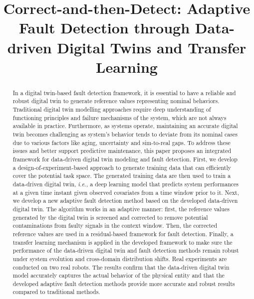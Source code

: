\documentclass[a4paper,10pt]{cas-sc}%
\newcommand{\rev}[1]{\textcolor{revisionred}{#1}}
\begin{document}
\let\WriteBookmarks\relax
\def\floatpagepagefraction{1}
\def\textpagefraction{.001}
\shorttitle{}
\let\printorcid\relax %



\title [mode = title]{Correct-and-then-Detect: Adaptive Fault Detection through Data-driven Digital Twins and Transfer Learning}




\begin{abstract}
	\rev{In a digital twin-based fault detection framework, it is essential to have a reliable and robust digital twin to generate reference values representing nominal behaviors. Traditional digital twin modelling approaches require deep understanding of functioning principles and failure mechanisms of the system, which are not always available in practice. Furthermore, as systems operate, maintaining an accurate digital twin becomes challenging as system's behavior tends to deviate from its nominal cases due to various factors like aging, uncertainty and sim-to-real gaps. To address these issues and better support predictive maintenance, this paper proposes an integrated framework for data-driven digital twin modeling and fault detection. First, we develop a design-of-experiment-based approach to generate training data that can efficiently cover the potential task space. The generated training data are then used to train a data-driven digital twin, \emph{i.e.,} a deep learning model that predicts system performances at a given time instant given observed covariates from a time window prior to it. Next, we develop a new adaptive fault detection method based on the developed data-driven digital twin. The algorithm works in an adaptive manner: first, the reference values generated by the digital twin is screened and corrected to remove potential contaminations from faulty signals in the context window. Then, the corrected reference values are used in a residual-based framework for fault detection. Finally, a transfer learning mechanism is applied in the developed framework to make sure the performance of the data-driven digital twin and fault detection methods remain robust under system evolution and cross-domain distribution shifts. Real experiments are conducted on two real robots. The results confirm that the data-driven digital twin model accurately captures the actual behavior of the physical entity and that the developed adaptive fault detection methods provide more accurate and robust results compared to traditional methods.}
\end{abstract}
\end{document}
